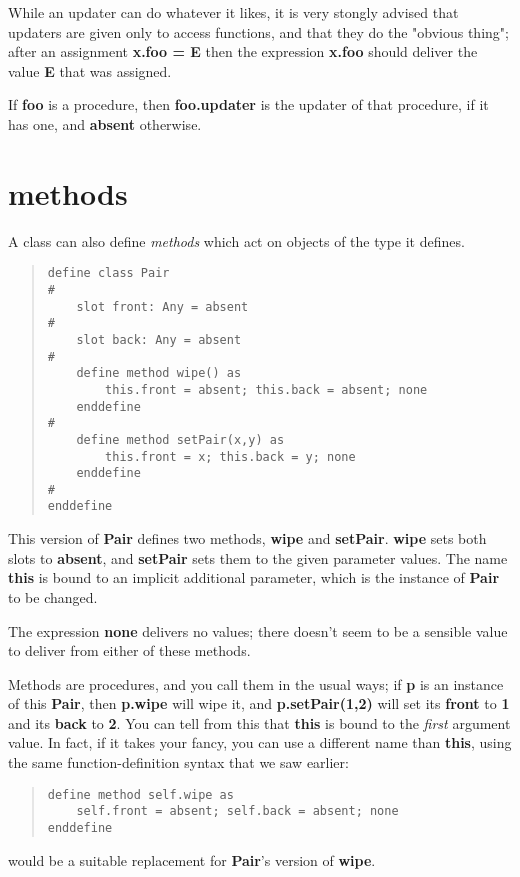\documentclass{report}
\begin{document}
While an updater can do whatever it likes, it is very stongly advised that
updaters are given only to access functions, and that they do the "obvious
thing"; after an assignment {\bf x.foo = E} then the expression {\bf x.foo} should
deliver the value {\bf E} that was assigned.

If {\bf foo} is a procedure, then {\bf foo.updater} is the updater of that procedure,
if it has one, and {\bf absent} otherwise.
\section{methods}


A class can also define {\em methods} which act on objects of the type it
defines.

\begin{quote}
\begin{verbatim}
define class Pair
#
    slot front: Any = absent
#
    slot back: Any = absent
#
    define method wipe() as
        this.front = absent; this.back = absent; none
    enddefine
#
    define method setPair(x,y) as
        this.front = x; this.back = y; none
    enddefine
#
enddefine
\end{verbatim}
\end{quote}
This version of {\bf Pair} defines two methods, {\bf wipe} and {\bf setPair}. {\bf wipe} sets
both slots to {\bf absent}, and {\bf setPair} sets them to the given parameter values.
The name {\bf this} is bound to an implicit additional parameter, which is the
instance of {\bf Pair} to be changed.

The expression {\bf none} delivers no values; there doesn't seem to be a sensible
value to deliver from either of these methods.

Methods are procedures, and you call them in the usual ways; if {\bf p} is an
instance of this {\bf Pair}, then {\bf p.wipe} will wipe it, and {\bf p.setPair(1,2)} will
set its {\bf front} to {\bf 1} and its {\bf back} to {\bf 2}. You can tell from this that
{\bf this} is bound to the {\em first} argument value. In fact, if it takes your
fancy, you can use a different name than {\bf this}, using the same
function-definition syntax that we saw earlier:

\begin{quote}
\begin{verbatim}
define method self.wipe as
    self.front = absent; self.back = absent; none
enddefine
\end{verbatim}
\end{quote}
would be a suitable replacement for {\bf Pair}'s version of {\bf wipe}.
\end{document}
